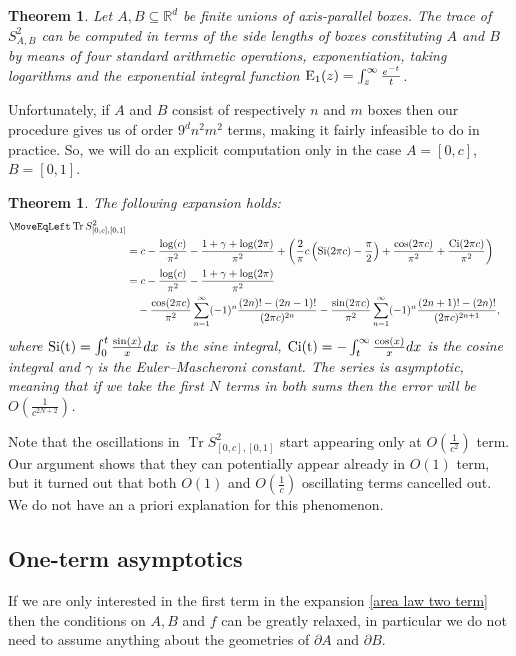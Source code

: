\documentclass[12pt]{amsart}
\numberwithin{equation}{section}
\newcommand{\R}{\mathbb{R}}
\newtheorem{theorem}[Thm]{Theorem}
\begin{document}
\begin{theorem}\label{TrS2}
Let $A, B\subseteq \R^d$ be finite unions of axis-parallel boxes. The trace of $S^2_{A,B}$ can be computed in terms of the side lengths of boxes constituting $A$ and $B$ by means of four standard arithmetic operations, exponentiation, taking logarithms and the exponential integral function ${\rm E_1}(z) = \int_z^\infty \frac{e^{-t}}{t}$.
\end{theorem}
Unfortunately, if $A$ and $B$ consist of respectively $n$ and $m$ boxes then our procedure gives us of order $9^d n^2m^2$ terms, making it fairly infeasible to do in practice. So, we will do an explicit computation only in the case $A = [0, c]$, $B = [0, 1]$.
\begin{theorem}\label{TrS2 explicit}
The following expansion holds:
\begin{align*}
\MoveEqLeft \operatorname{Tr}S_{[0,c], [0,1]}^2\\
&= c - \frac{\log(c)}{\pi^2} - \frac{1+\gamma + \log(2\pi)}{\pi^2} + \left(\frac{2}{\pi} c\left({\rm Si}(2\pi c)-\frac{\pi}{2}\right) + \frac{\cos(2\pi c)}{\pi^2} + \frac{{\rm Ci}(2\pi c)}{\pi^2}\right)\\
&=c - \frac{\log(c)}{\pi^2} - \frac{1+\gamma + \log(2\pi)}{\pi^2}\\
&\quad - \frac{\cos(2\pi c)}{\pi^2}\sum_{n=1}^\infty (-1)^{n} \frac{(2n)!-(2n-1)!}{(2 \pi c)^{2n}} - \frac{\sin(2\pi c)}{\pi^2} \sum_{n=1}^\infty (-1)^n \frac{(2n+1)!-(2n)!}{(2\pi c)^{2n+1}},
\end{align*}
where ${\rm Si(t)} = \int_0^t \frac{\sin (x)}{x}dx$ is the sine integral, ${\rm Ci(t)} = -\int_t^\infty \frac{\cos(x)}{x}dx$ is the cosine integral and $\gamma$ is the Euler--Mascheroni constant. The series is asymptotic, meaning that if we take the first $N$ terms in both sums then the error will be $O\left(\frac{1}{c^{2N+2}}\right)$.
\end{theorem}
Note that the oscillations in $\operatorname{Tr}S_{[0,c], [0,1]}^2$ start appearing only at $O(\frac{1}{c^2})$ term. Our argument shows that they can potentially appear already in $O(1)$ term, but it turned out that both $O(1)$ and $O(\frac{1}{c})$ oscillating terms cancelled out. We do not have an a priori explanation for this phenomenon.

\subsection{One-term asymptotics}
If we are only interested in the first term in the expansion \eqref{area law two term} then the conditions on $A, B$ and $f$ can be greatly relaxed, in particular we do not need to assume anything about the geometries of $\partial A$ and $\partial B$.
\end{document}

